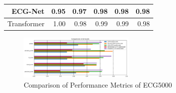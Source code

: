 \documentclass[nonacm,sigconf]{acmart}
\begin{document}
\begin{table}[h]
{\begin{tabular}{|r|r|r|r|r|r|}
{\color[HTML]{000000} ECG-Net}                 & {\color[HTML]{000000} 0.95}                      & {\color[HTML]{000000} 0.97}                   & {\color[HTML]{000000} 0.98}               & {\color[HTML]{000000} 0.98}                     & {\color[HTML]{000000} 0.98}           \\ \hline
{\color[HTML]{000000} Transformer} & {\color[HTML]{000000} 1.00}                      & {\color[HTML]{000000} 0.98}                   & {\color[HTML]{000000} 0.99}               & {\color[HTML]{000000} 0.99}                     & {\color[HTML]{000000} 0.98}           \\ \hline
\end{tabular}}
\end{table}
\begin{figure}[h]
  \centering
  \includegraphics[width=0.5\textwidth]{ecg5000/performance.png}
  \caption{Comparison of Performance Metrics of ECG5000}
  \label{tab:Fig1}
\end{figure}
\end{document}
